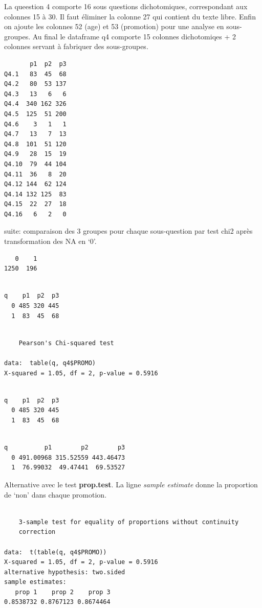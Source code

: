 \documentclass[]{article}
\begin{document}
La queestion 4 comporte 16 sous questions dichotomiques, correspondant
aux colonnes 15 à 30. Il faut éliminer la colonne 27 qui contient du
texte libre. Enfin on ajoute les colonnes 52 (age) et 53 (promotion)
pour une analyse en sous-groupes. Au final le dataframe q4 comporte 15
colonnes dichotomiqes + 2 colonnes servant à fabriquer des sous-groupes.

\begin{verbatim}
       p1  p2  p3
Q4.1   83  45  68
Q4.2   80  53 137
Q4.3   13   6   6
Q4.4  340 162 326
Q4.5  125  51 200
Q4.6    3   1   1
Q4.7   13   7  13
Q4.8  101  51 120
Q4.9   28  15  19
Q4.10  79  44 104
Q4.11  36   8  20
Q4.12 144  62 124
Q4.14 132 125  83
Q4.15  22  27  18
Q4.16   6   2   0
\end{verbatim}

suite: comparaison des 3 groupes pour chaque sous-question par test chi2
après transformation des NA en `0'.

\begin{verbatim}
   0    1 
1250  196 
\end{verbatim}

\begin{verbatim}
   
q    p1  p2  p3
  0 485 320 445
  1  83  45  68
\end{verbatim}

\begin{verbatim}

    Pearson's Chi-squared test

data:  table(q, q4$PROMO)
X-squared = 1.05, df = 2, p-value = 0.5916
\end{verbatim}

\begin{verbatim}
   
q    p1  p2  p3
  0 485 320 445
  1  83  45  68
\end{verbatim}

\begin{verbatim}
   
q          p1        p2        p3
  0 491.00968 315.52559 443.46473
  1  76.99032  49.47441  69.53527
\end{verbatim}

Alternative avec le test \textbf{prop.test}. La ligne \emph{sample
estimate} donne la proportion de `non' dans chaque promotion.

\begin{verbatim}

    3-sample test for equality of proportions without continuity
    correction

data:  t(table(q, q4$PROMO))
X-squared = 1.05, df = 2, p-value = 0.5916
alternative hypothesis: two.sided
sample estimates:
   prop 1    prop 2    prop 3 
0.8538732 0.8767123 0.8674464 
\end{verbatim}
\end{document}
